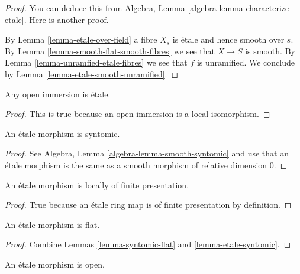 \begin{proof}
You can deduce this from
Algebra, Lemma \ref{algebra-lemma-characterize-etale}.
Here is another proof.

\medskip\noindent
By Lemma \ref{lemma-etale-over-field} a fibre $X_s$ is \'etale
and hence smooth over $s$. By Lemma \ref{lemma-smooth-flat-smooth-fibres}
we see that $X \to S$ is smooth.
By Lemma \ref{lemma-unramfied-etale-fibres}
we see that $f$ is unramified. We conclude by
Lemma \ref{lemma-etale-smooth-unramified}.
\end{proof}

\begin{lemma}
\label{lemma-open-immersion-etale}
Any open immersion is \'etale.
\end{lemma}

\begin{proof}
This is true because an open immersion is a local isomorphism.
\end{proof}

\begin{lemma}
\label{lemma-etale-syntomic}
An \'etale morphism is syntomic.
\end{lemma}

\begin{proof}
See Algebra, Lemma \ref{algebra-lemma-smooth-syntomic} and use that an
\'etale morphism is the same as a smooth morphism of relative dimension $0$.
\end{proof}

\begin{lemma}
\label{lemma-etale-locally-finite-presentation}
An \'etale morphism is locally of finite presentation.
\end{lemma}

\begin{proof}
True because an \'etale ring map is of finite presentation by
definition.
\end{proof}

\begin{lemma}
\label{lemma-etale-flat}
An \'etale morphism is flat.
\end{lemma}

\begin{proof}
Combine Lemmas \ref{lemma-syntomic-flat} and \ref{lemma-etale-syntomic}.
\end{proof}

\begin{lemma}
\label{lemma-etale-open}
An \'etale morphism is open.
\end{lemma}

